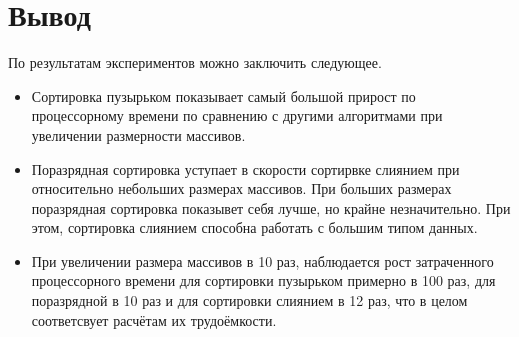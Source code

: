 \section{Вывод}
По результатам экспериментов можно заключить следующее.
\begin{itemize}
	\item Сортировка пузырьком показывает самый большой прирост по процессорному времени по сравнению с другими алгоритмами при увеличении размерности массивов.
	\item Поразрядная сортировка уступает в скорости сортирвке слиянием при относительно небольших размерах массивов. При больших размерах поразрядная сортировка показывет себя лучше, но крайне незначительно. При этом, сортировка слиянием способна работать с большим типом данных.
	\item При увеличении размера массивов в 10 раз, наблюдается рост затраченного процессорного времени для сортировки пузырьком примерно в 100 раз, для поразрядной в 10 раз и для сортировки слиянием в 12 раз, что в целом соответсвует расчётам их трудоёмкости.
\end{itemize}


	